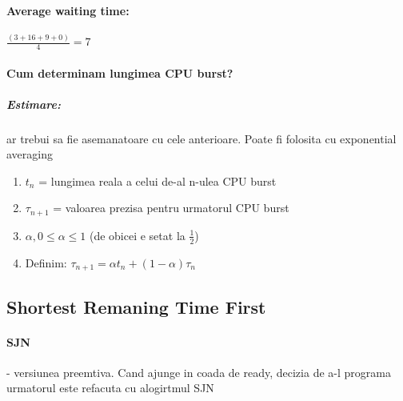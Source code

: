 \documentclass{article}
\begin{document}
\begin{center}
\end{center}

\paragraph*{Average waiting time:} $\frac{(3+16+9+0)}{4} = 7$

\paragraph*{Cum determinam lungimea CPU burst?}
\subparagraph*{Estimare:} ar trebui sa fie asemanatoare cu cele anterioare. Poate fi folosita cu exponential averaging
\begin{enumerate}
    \item $t_n$ = lungimea reala a celui de-al n-ulea CPU burst
    \item $\tau_{n+1}$ = valoarea prezisa pentru urmatorul CPU burst
    \item $\alpha,0 \leq \alpha \leq 1$ (de obicei e setat la $\frac{1}{2}$)
    \item Definim: $\tau_{n+1} = \alpha t_n + (1-\alpha) \tau_{n}$
\end{enumerate}

\subsection*{Shortest Remaning Time First}
\paragraph*{SJN} - versiunea preemtiva. Cand ajunge in coada de ready, decizia de a-l programa urmatorul este refacuta cu alogirtmul SJN
\end{document}
